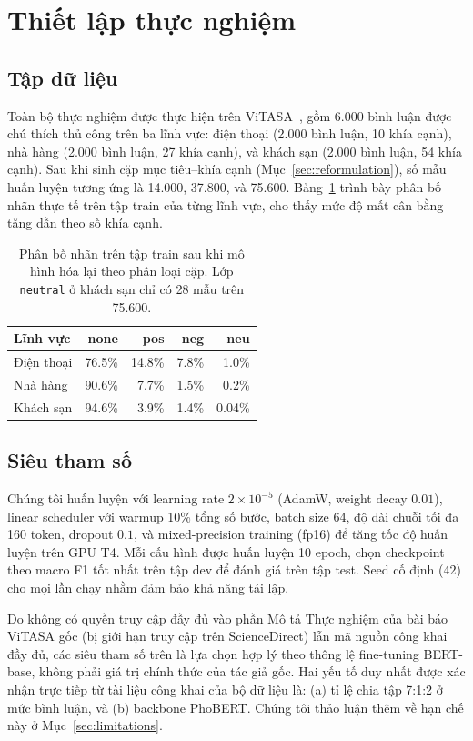 \documentclass[11pt]{article}
\begin{document}
\section{Thiết lập thực nghiệm}
\label{sec:setup}

\subsection{Tập dữ liệu}
Toàn bộ thực nghiệm được thực hiện trên ViTASA~\citep{tran2025vitasa}, gồm 6.000 bình luận được chú thích thủ công trên ba lĩnh vực: điện thoại (2.000 bình luận, 10 khía cạnh), nhà hàng (2.000 bình luận, 27 khía cạnh), và khách sạn (2.000 bình luận, 54 khía cạnh). Sau khi sinh cặp mục tiêu--khía cạnh (Mục~\ref{sec:reformulation}), số mẫu huấn luyện tương ứng là 14.000, 37.800, và 75.600. Bảng~\ref{tab:label-dist} trình bày phân bố nhãn thực tế trên tập train của từng lĩnh vực, cho thấy mức độ mất cân bằng tăng dần theo số khía cạnh.

\begin{table}[t]
\centering
\small
\begin{tabular}{lrrrr}
\toprule
\textbf{Lĩnh vực} & \textbf{none} & \textbf{pos} & \textbf{neg} & \textbf{neu} \\
\midrule
Điện thoại  & 76.5\% & 14.8\% & 7.8\% & 1.0\% \\
Nhà hàng    & 90.6\% & 7.7\%  & 1.5\% & 0.2\% \\
Khách sạn   & 94.6\% & 3.9\%  & 1.4\% & 0.04\% \\
\bottomrule
\end{tabular}
\caption{Phân bố nhãn trên tập train sau khi mô hình hóa lại theo phân loại cặp. Lớp \texttt{neutral} ở khách sạn chỉ có 28 mẫu trên 75.600.}
\label{tab:label-dist}
\end{table}

\subsection{Siêu tham số}
Chúng tôi huấn luyện với learning rate $2\times 10^{-5}$ (AdamW, weight decay $0.01$), linear scheduler với warmup 10\% tổng số bước, batch size 64, độ dài chuỗi tối đa 160 token, dropout $0.1$, và mixed-precision training (fp16) để tăng tốc độ huấn luyện trên GPU T4. Mỗi cấu hình được huấn luyện 10 epoch, chọn checkpoint theo macro F1 tốt nhất trên tập dev để đánh giá trên tập test. Seed cố định ($42$) cho mọi lần chạy nhằm đảm bảo khả năng tái lập.

Do không có quyền truy cập đầy đủ vào phần Mô tả Thực nghiệm của bài báo ViTASA gốc (bị giới hạn truy cập trên ScienceDirect) lẫn mã nguồn công khai đầy đủ, các siêu tham số trên là lựa chọn hợp lý theo thông lệ fine-tuning BERT-base, không phải giá trị chính thức của tác giả gốc. Hai yếu tố duy nhất được xác nhận trực tiếp từ tài liệu công khai của bộ dữ liệu là: (a) tỉ lệ chia tập 7:1:2 ở mức bình luận, và (b) backbone PhoBERT. Chúng tôi thảo luận thêm về hạn chế này ở Mục~\ref{sec:limitations}.
\end{document}
